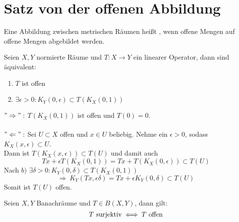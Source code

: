 
\section{Satz von der offenen Abbildung}



\begin{definition} \label{def:10.1-offAbbildung}
	Eine Abbildung zwischen metrischen Räumen heißt , wenn offene Mengen auf offene Mengen abgebildet werden.
\end{definition}


\begin{lemma} \label{lemma:10.2}
	Seien $X, Y$ normierte Räume und $T: X \rightarrow Y$ ein linearer Operator, dann sind äquivalent:
	\begin{enumerate}[label=\alph*\upshape)]
		\item $T$ ist offen
		\item $\exists \epsilon > 0: K_{Y}(0, \epsilon) \subset T(K_{X}(0, 1))$
	\end{enumerate}
\end{lemma}

\begin{beweis}
	$"\Rightarrow":$ $T(K_{X}(0, 1))$ ist offen und $T(0) = 0$. \\ \\
	$"\Leftarrow":$ Sei $U \subset X$ offen und $x \in U$ beliebig. Nehme ein $\epsilon > 0$, sodass $K_{X}(x, \epsilon) \subset U$. \\
	Dann ist $T( K_{X}(x, \epsilon)) \subset T(U)$ und damit auch
	\[ Tx + \epsilon T(K_{X}(0, 1)) = Tx + T(K_{X}(0, \epsilon)) \subset T(U) \]
	Nach $b)$ $\exists \delta > 0: K_{Y}(0, \delta) \subset T(K_{X}(0, 1))$
	\[ \Rightarrow ~ K_{Y}(Tx, \epsilon \delta) = T x + \epsilon K_{Y}(0, \delta) \subset T(U) \]	
	Somit ist $T(U)$ offen.
\end{beweis}


\begin{satz}   \label{satz:10.3-offeneAbbildung}
	Seien $X, Y$ Banachräume und $T \in B(X, Y)$, dann gilt:
	\[ T \text{ surjektiv} \iff T \text{ offen} \]
\end{satz}

